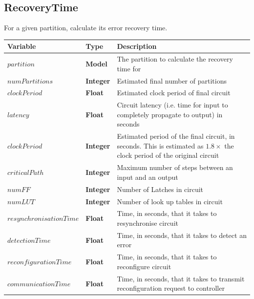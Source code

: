 \documentclass[12pt,final,oneside]{dwThesis} %
\begin{document}
   \newpage 
   \subsection{RecoveryTime}
   For a given partition, calculate its
   error recovery time.  
   \begin{algorithm}

      \begin{center}


         \begin{tabularx}
            {\linewidth}{llX} \toprule Variable & Type &
            Description\\
            \midrule
            $partition$ & \textbf{Model} & The partition to calculate the recovery time for\\
            $numPartitions$ &\textbf{Integer } &  Estimated final number of partitions \\
            $clockPeriod$ & \textbf{Float} & Estimated clock period of final circuit\\$latency$ &\textbf{Float } &  Circuit
            latency (i.e. time for input to completely propagate to output) in
            seconds\\
            $clockPeriod$ &\textbf{Integer } & Estimated period of
            the final circuit, in seconds. This is estimated as $1.8\times$ the
            clock period of the original circuit\\
            $criticalPath$ &\textbf{Integer } &  Maximum number of steps between an input and an
            output\\
            $numFF$ &\textbf{Integer } &  Number of Latches in
            circuit\\
            $numLUT$ &\textbf{Integer } &  Number of look up tables
            in circuit\\
            $resynchronisationTime$ &\textbf{Float } &  Time, in
            seconds, that it takes to resynchronise circuit\\
            $detectionTime$
            &\textbf{Float } &  Time, in seconds, that it takes to detect an
            error\\
            $reconfigurationTime$ &\textbf{Float } &  Time, in
            seconds, that it takes to reconfigure circuit\\
            $communicationTime$
            &\textbf{Float } &  Time, in seconds, that it takes to transmit
            reconfiguration request to controller\\
            \bottomrule


\end{tabularx}
\end{center}
\end{algorithm}
\end{document}
